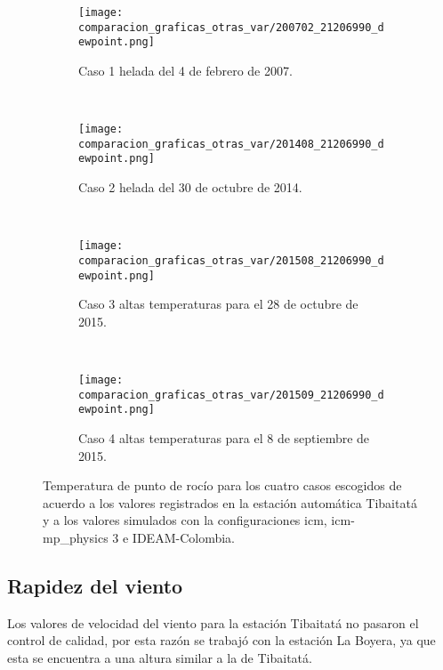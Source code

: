 \begin{figure}[H]
    
\begin{subfigure}[normla]{0.4\textwidth}
\caption{Caso 1 helada del 4 de febrero de 2007.}
\label{caso1_tiba_wrf_dp}
\texttt{[image: comparacion\_graficas\_otras\_var/200702\_21206990\_dewpoint.png]}
\end{subfigure}
~
\begin{subfigure}[normla]{0.4\textwidth}
\caption{Caso 2 helada del 30 de octubre de 2014.}
\label{caso2_tiba_wrf_dp}
\texttt{[image: comparacion\_graficas\_otras\_var/201408\_21206990\_dewpoint.png]}
\end{subfigure}
~
\centering
\begin{subfigure}[normla]{0.4\textwidth}
\caption{Caso 3 altas temperaturas para el 28 de octubre de 2015.}
\label{caso3_tiba_wrf_dp}
\texttt{[image: comparacion\_graficas\_otras\_var/201508\_21206990\_dewpoint.png]}
\end{subfigure}
~
\centering
\begin{subfigure}[normla]{0.4\textwidth}
\caption{Caso 4 altas temperaturas para el 8 de septiembre de 2015.}
\label{caso4_tiba_wrf_dp}
\texttt{[image: comparacion\_graficas\_otras\_var/201509\_21206990\_dewpoint.png]}
\end{subfigure}

    \caption{Temperatura de punto de rocío para los cuatro casos escogidos de acuerdo a los valores registrados en la estación automática Tibaitatá y a los valores simulados con la configuraciones icm, icm-mp\_physics 3 e IDEAM-Colombia.}
    \label{fig:wrf_dp_tibaitata}
\end{figure}


\subsection{Rapidez del viento}

Los valores de velocidad del viento para la estación Tibaitatá no pasaron el control de calidad, por esta razón se trabajó con la estación La Boyera, ya que esta se encuentra a una altura similar a la de Tibaitatá.\\

